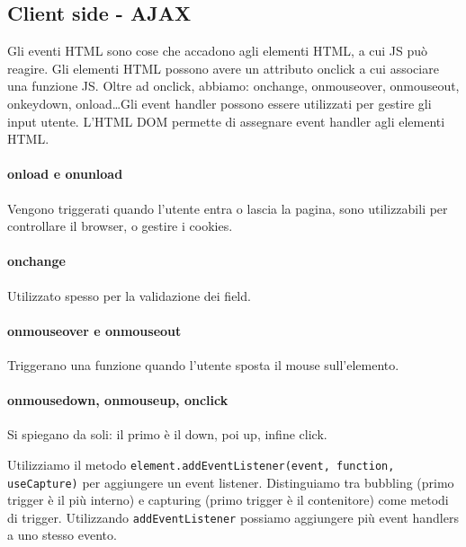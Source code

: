 \documentclass[11pt]{article}
\newcommand{\code}[1]{\texttt{#1}}
\begin{document}
\subsection{Client side - AJAX}
Gli eventi HTML sono cose che accadono agli elementi HTML, a cui JS può reagire. Gli elementi HTML possono avere un attributo onclick a cui associare una funzione JS. Oltre ad onclick, abbiamo: onchange, onmouseover, onmouseout, onkeydown, onload\dots Gli event handler possono essere utilizzati per gestire gli input utente. L'HTML DOM permette di assegnare event handler agli elementi HTML. 
\paragraph{onload e onunload} Vengono triggerati quando l'utente entra o lascia la pagina, sono utilizzabili per controllare il browser, o gestire i cookies.
\paragraph{onchange} Utilizzato spesso per la validazione dei field.
\paragraph{onmouseover e onmouseout} Triggerano una funzione quando l'utente sposta il mouse sull'elemento. 
\paragraph{onmousedown, onmouseup, onclick} Si spiegano da soli: il primo è il down, poi up, infine click. 

Utilizziamo il metodo \code{element.addEventListener(event, function, useCapture)} per aggiungere un event listener. Distinguiamo tra bubbling (primo trigger è il più interno) e capturing (primo trigger è il contenitore) come metodi di trigger. Utilizzando \code{addEventListener} possiamo aggiungere più event handlers a uno stesso evento. 
\end{document}
